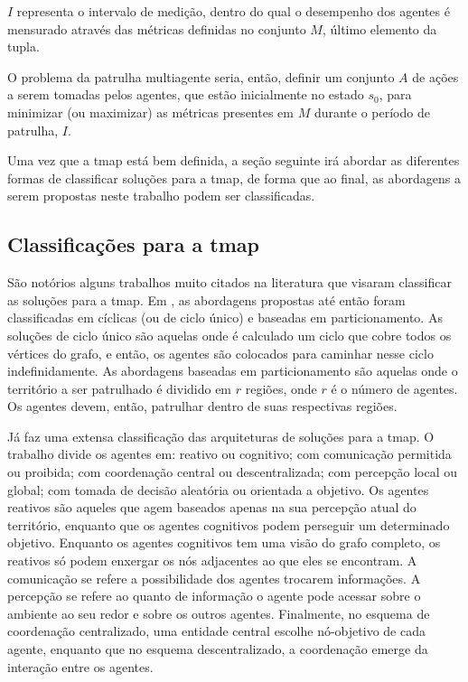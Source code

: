 $I$ representa o intervalo de medição, dentro do qual o desempenho dos agentes 
é mensurado através das métricas definidas no conjunto $M$, último elemento da 
tupla.

O problema da patrulha multiagente seria, então, definir um conjunto $A$ de 
ações a serem tomadas pelos agentes, que estão inicialmente no estado $s_{0}$, 
para minimizar (ou maximizar) as métricas presentes em $M$ durante o período de 
patrulha, $I$.

Uma vez que a \ac{tmap} está bem definida, a seção seguinte irá abordar as 
diferentes formas de classificar soluções para a \ac{tmap}, de forma que ao 
final, as abordagens a serem propostas neste trabalho podem ser classificadas.

\subsection{Classificações para a \ac{tmap}}
\label{sec:classifytmap}

São notórios alguns trabalhos muito citados na literatura que visaram 
classificar as soluções para a \ac{tmap}. Em 
\citep{Chevaleyre:2004:TAM:1018411.1019013}, as abordagens propostas até 
então foram classificadas em cíclicas (ou de ciclo único) e 
baseadas em particionamento. As soluções de ciclo único são aquelas onde é 
calculado um ciclo que cobre todos os vértices do grafo, e então, os agentes são 
colocados para caminhar nesse ciclo indefinidamente. As abordagens baseadas em 
particionamento são aquelas onde o território a ser patrulhado é dividido em 
$r$ regiões, onde $r$ é o número de agentes. Os agentes devem, então, patrulhar 
dentro de suas respectivas regiões.

Já \citep{Machado:2002:MPE:1765317.1765332} faz uma extensa classificação das 
arquiteturas de soluções para a \ac{tmap}. O trabalho divide os agentes em: 
reativo ou cognitivo; com comunicação permitida ou 
proibida; com coordenação central ou descentralizada; com 
percepção local ou global; com tomada de decisão 
aleatória ou orientada a objetivo. Os agentes reativos são aqueles que 
agem baseados apenas na sua percepção atual do território, enquanto que os 
agentes cognitivos podem perseguir um determinado objetivo. Enquanto os agentes 
cognitivos tem uma visão do grafo completo, os reativos só podem enxergar os nós 
adjacentes ao que eles se encontram. A comunicação se refere a possibilidade dos 
agentes trocarem informações. A percepção se refere ao quanto de informação o 
agente pode acessar sobre o ambiente ao seu redor e sobre os outros agentes. 
Finalmente, no esquema de coordenação centralizado, uma entidade central escolhe 
nó-objetivo de cada agente, enquanto que no esquema descentralizado, a 
coordenação emerge da interação entre os agentes.


